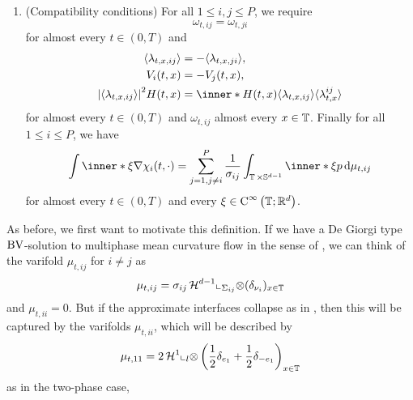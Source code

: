 \begin{definition}
\begin{enumerate}
		\item (Compatibility conditions)
		For all $ 1 \leq i , j \leq P $, we require 
		\begin{equation}
			\label{varifold_symmetry_of_energy_measures}
			\omega_{ t , i j }
			=
			\omega_{ t , j i } 
		\end{equation}
		for almost every $ t \in ( 0 , T ) $ and
		\begin{align}
			\label{varifold_symmetry_expectations}
			\langle \lambda_{ t, x , i j } \rangle
			&= 
			- \langle \lambda_{ t, x  ,j i } \rangle,
			\\
			\label{varifold_symmetry_velocities}
			V_{ i } ( t, x ) 
			&= 
			- V_{ j } ( t, x ),
			\\
			\label{varifold_mean_curvature_points_in_normal_direction}
			\abs{ \langle \lambda_{ t , x , i j } \rangle }^{ 2 }
			H ( t, x )
			& =
			\inner*{ H( t , x ) }{ \langle \lambda_{ t , x , i j } \rangle }
			\langle \lambda_{ t , x }^{ i j } \rangle
		\end{align}
		for almost every $ t \in ( 0 , T ) $ and $ \omega_{ t , i j } $ 
		almost every $ x \in \operatorname{\mathbb{T}} $. Finally for all $ 1 \leq i \leq P $, 
		we 
		have
		\begin{equation}
			\label{varifold_compatibility_condition_multiphase}
			\int
			\inner*{ \xi }{ \nabla \chi_{ i } ( t , \cdot ) }
			=
			\sum_{ j = 1 , j \neq i }^{ P }
			\frac{ 1 }{ \sigma_{ i j } }
			\int_{ \flattorus \times \mathbb{ S }^{ d - 1 } }
			\inner*{ \xi }{ p }
			\dd{ \mu_{ t , i j } }
		\end{equation}
		for almost every $ t \in ( 0 , T ) $ and every $ \xi \in \operatorname{C}^{ 
			\infty } \left( \operatorname{\mathbb{T}} ; \mathbb{ R }^{ d } \right) $.
	\end{enumerate}
\end{definition}

As before, we first want to motivate this definition. If we have a De Giorgi 
type $ \operatorname{BV} $-solution to multiphase mean curvature flow in the sense of 
, we 
can think of the varifold $ \mu_{ t , i j } $ for $ i \neq j $ as
\begin{equation}
	\label{varifold_simplest_case_mutliphase}
	\mu_{ t , i j }
	=
	\sigma_{ i j }
	 \operatorname{\mathcal{H}}^{ d - 1 }\llcorner_{ \Sigma_{ i j } } 
	\otimes
	( \delta_{ \nu_{ i } } )_{ x \in \operatorname{\mathbb{T}} }
\end{equation}
and $ \mu_{ t , i i } = 0 $.
But if the approximate interfaces collapse as in 
, then this will be captured by the 
varifolds $ \mu_{ t, i i }$, which will be 
described by
\begin{equation}
	\label{varifold_when_interfaces_collapse}
	\mu_{ t, 1 1 }
	=
	2
	\operatorname{\mathcal{H}}^{ 1 } \llcorner_{ l }
	\otimes
	\left( 
		\frac{ 1 }{ 2 } \delta_{ e_{ 1 } } 
		+ 
		\frac{ 1 }{ 2 } \delta_{ - e_{ 1 } } 
	\right)_{ x \in \operatorname{\mathbb{T}} }
\end{equation}
as in the two-phase case,

